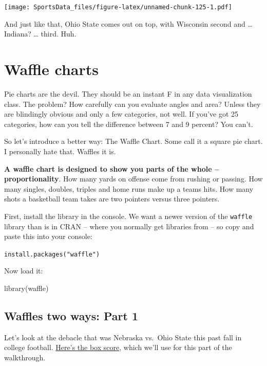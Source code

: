 \documentclass[
]{book}
\newenvironment{Shaded}{\begin{snugshade}}{\end{snugshade}}
\newcommand{\FunctionTok}[1]{\textcolor[rgb]{0.00,0.00,0.00}{#1}}
\newcommand{\NormalTok}[1]{#1}
\begin{document}
\texttt{[image: SportsData\_files/figure-latex/unnamed-chunk-125-1.pdf]}

And just like that, Ohio State comes out on top, with Wisconsin second and \ldots{} Indiana? \ldots{} third. Huh.

\hypertarget{waffle-charts}{%
\chapter{Waffle charts}\label{waffle-charts}}

Pie charts are the devil. They should be an instant F in any data visualization class. The problem? How carefully can you evaluate angles and area? Unless they are blindingly obvious and only a few categories, not well. If you've got 25 categories, how can you tell the difference between 7 and 9 percent? You can't.

So let's introduce a better way: The Waffle Chart. Some call it a square pie chart. I personally hate that. Waffles it is.

\textbf{A waffle chart is designed to show you parts of the whole -- proportionality}. How many yards on offense come from rushing or passing. How many singles, doubles, triples and home runs make up a teams hits. How many shots a basketball team takes are two pointers versus three pointers.

First, install the library in the console. We want a newer version of the \texttt{waffle} library than is in CRAN -- where you normally get libraries from -- so copy and paste this into your console:

\texttt{install.packages("waffle")}

Now load it:

\begin{Shaded}
\begin{Highlighting}[]
\FunctionTok{library}\NormalTok{(waffle)}
\end{Highlighting}
\end{Shaded}

\hypertarget{waffles-two-ways-part-1}{%
\section{Waffles two ways: Part 1}\label{waffles-two-ways-part-1}}

Let's look at the debacle that was Nebraska vs.~Ohio State this past fall in college football. \href{https://www.espn.com/college-football/matchup?gameId=401112241}{Here's the box score}, which we'll use for this part of the walkthrough.
\end{document}
